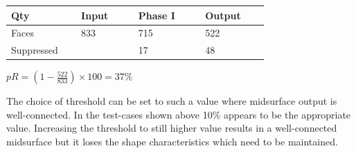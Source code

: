 \begin{enumerate}
\begin{minipage}[c]{0.6\linewidth}
\begin{tabular}[h]{@{} p{0.22\linewidth} p{0.18\linewidth} p{0.21\linewidth} p{0.2\linewidth} @{}}\toprule
\textbf{Qty} & \textbf{Input} & \textbf{Phase I} & \textbf{Output}\\  \midrule
Faces  & 833 & 715 & 522\\
Suppressed  &  &17 & 48\\
\bottomrule
\end{tabular}
\end{minipage}
\begin{minipage}[c]{0.38\linewidth}
$pR = (1 - \frac{522}{833}) \times 100 = 37\%$
\end{minipage}
\end{enumerate}

The choice of threshold can be set to such a value where midsurface output is well-connected. In the test-cases shown above 10\% appears to be the appropriate value. Increasing the threshold to still higher value results in a well-connected midsurface but it loses the shape characteristics which need to be maintained.
